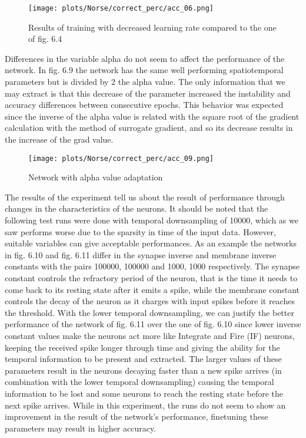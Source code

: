 \documentclass[12pt]{report}
\begin{document}
\begin{figure}[htp] %
    \centering
     \texttt{[image: plots/Norse/correct\_perc/acc\_06.png]}
    \caption{Results of training with decreased learning rate compared to the one of fig. 6.4}
    \label{fig:representation-methods}
\end{figure}

Differences in the variable alpha do not seem to affect the performance of the network. In fig. 6.9 the network has the same well performing spatiotemporal parameters but is divided by 2 the alpha value. The only information that we may extract is that this decrease of the parameter increased the instability and accuracy differences between consecutive epochs. This behavior was expected since the inverse of the alpha value is related with the square root of the gradient calculation with the method of surrogate gradient, and so its decrease results in the increase of the grad value.

\begin{figure}[htp] %
    \centering
     \texttt{[image: plots/Norse/correct\_perc/acc\_09.png]}
    \caption{Network with alpha value adaptation}
    \label{fig:representation-methods}
\end{figure}


The results of the experiment tell us about the result of performance through changes in the characteristics of the neurons. It should be noted that the following test runs were done with temporal downsampling of 10000, which as we saw performs worse due to the sparsity in time of the input data. However, suitable variables can give acceptable performances. As an example the networks in fig. 6.10 and fig. 6.11 differ in the synapse inverse and membrane inverse constants with the pairs 100000, 100000 and 1000, 1000 respectively. The synapse constant controls the refractory period of the neuron, that is the time it needs to come back to its resting state after it emits a spike, while the membrane constant controls the decay of the neuron as it charges with input spikes before it reaches the threshold. With the lower temporal downsampling, we can justify the better performance of the network of fig. 6.11 over the one of fig. 6.10 since lower inverse constant values make the neurons act more like Integrate and Fire (IF) neurons, keeping the received spike longer through time and giving the ability for the temporal information to be present and extracted. The larger values of these parameters result in the neurons decaying faster than a new spike arrives (in combination with the lower temporal downsampling) causing the temporal information to be lost and some neurons to reach the resting state before the next spike arrives. While in this experiment, the runs do not seem to show an improvement in the result of the network's performance, finetuning these parameters may result in higher accuracy.
\end{document}
